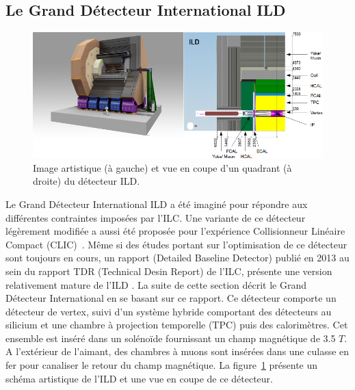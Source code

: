 \subsection{Le Grand Détecteur International ILD}
\begin{figure}[!ht]
  \begin{center}
    \includegraphics[width=1.0\textwidth]{ILC/figs/ild.png}
    \caption{Image artistique (à gauche) et vue en coupe d'un quadrant (à droite) du détecteur ILD.}
    \label{fig:ild-scheme}
  \end{center}
\end{figure}
Le Grand Détecteur International ILD a été imaginé pour répondre aux différentes contraintes imposées par l'ILC. Une variante de ce détecteur légèrement modifiée a aussi été proposée pour l'expérience Collisionneur Linéaire Compact (CLIC)~\cite{clic}. Même si des études portant sur l'optimisation de ce détecteur sont toujours en cours, un rapport (Detailed Baseline Detector) publié en 2013 au sein du rapport TDR (Technical Desin Report) de l'ILC, présente une version relativement mature de l'ILD \cite{detectorTDR}. La suite de cette section décrit le Grand Détecteur International en se basant sur ce rapport. Ce détecteur comporte un détecteur de vertex, suivi d'un système hybride comportant des détecteurs au silicium et une chambre à projection temporelle (TPC) puis des calorimètres. Cet ensemble est inséré dans un solénoïde fournissant un champ magnétique de 3.5 $T$. A l'extérieur de l'aimant, des chambres à muons sont insérées dans une culasse en fer pour canaliser le retour du champ magnétique. La figure~\ref{fig:ild-scheme} présente un schéma artistique de l'ILD et une vue en coupe de ce détecteur. 
